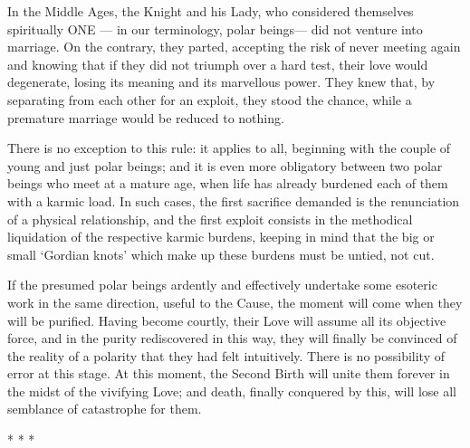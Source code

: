 \begin{quotationx}
In the Middle Ages, the Knight and his Lady, who considered themselves spiritually ONE — in our terminology, polar beings— did not venture into marriage. On the contrary, they parted, accepting the risk of never meeting again and knowing that if they did not triumph over a hard test, their love would degenerate, losing its meaning and its marvellous power. They knew that, by separating from each other for an exploit, they stood the chance, while a premature marriage would be reduced to nothing.

There is no exception to this rule: it applies to all, beginning with the couple of young and just polar beings; and it is even more obligatory between two polar beings who meet at a mature age, when life has already burdened each of them with a karmic load. In such cases, the first sacrifice demanded is the renunciation of a physical relationship, and the first exploit consists in the methodical liquidation of the respective karmic burdens, keeping in mind that the big or small `Gordian knots' which make up these burdens must be untied, not cut.

If the presumed polar beings ardently and effectively undertake some esoteric work in the same direction, useful to the Cause, the moment will come when they will be purified. Having become courtly, their Love will assume all its objective force, and in the purity rediscovered in this way, they will finally be convinced of the reality of a polarity that they had felt intuitively. There is no possibility of error at this stage. At this moment, the Second Birth will unite them forever in the midst of the vivifying Love; and death, finally conquered by this, will lose all semblance of catastrophe for them. 

\end{quotationx}



\begin{center}* * *\end{center}


